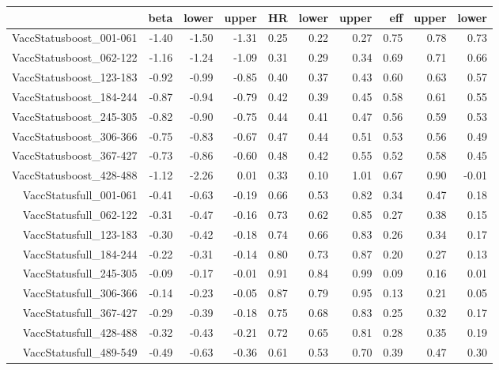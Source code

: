 \begin{table}[ht]
\centering
\begin{tabular}{rrrrrrrrrr}
  \hline
 & beta & lower & upper & HR & lower & upper & eff & upper & lower \\ 
  \hline
VaccStatusboost\_001-061 & -1.40 & -1.50 & -1.31 & 0.25 & 0.22 & 0.27 & 0.75 & 0.78 & 0.73 \\ 
  VaccStatusboost\_062-122 & -1.16 & -1.24 & -1.09 & 0.31 & 0.29 & 0.34 & 0.69 & 0.71 & 0.66 \\ 
  VaccStatusboost\_123-183 & -0.92 & -0.99 & -0.85 & 0.40 & 0.37 & 0.43 & 0.60 & 0.63 & 0.57 \\ 
  VaccStatusboost\_184-244 & -0.87 & -0.94 & -0.79 & 0.42 & 0.39 & 0.45 & 0.58 & 0.61 & 0.55 \\ 
  VaccStatusboost\_245-305 & -0.82 & -0.90 & -0.75 & 0.44 & 0.41 & 0.47 & 0.56 & 0.59 & 0.53 \\ 
  VaccStatusboost\_306-366 & -0.75 & -0.83 & -0.67 & 0.47 & 0.44 & 0.51 & 0.53 & 0.56 & 0.49 \\ 
  VaccStatusboost\_367-427 & -0.73 & -0.86 & -0.60 & 0.48 & 0.42 & 0.55 & 0.52 & 0.58 & 0.45 \\ 
  VaccStatusboost\_428-488 & -1.12 & -2.26 & 0.01 & 0.33 & 0.10 & 1.01 & 0.67 & 0.90 & -0.01 \\ 
  VaccStatusfull\_001-061 & -0.41 & -0.63 & -0.19 & 0.66 & 0.53 & 0.82 & 0.34 & 0.47 & 0.18 \\ 
  VaccStatusfull\_062-122 & -0.31 & -0.47 & -0.16 & 0.73 & 0.62 & 0.85 & 0.27 & 0.38 & 0.15 \\ 
  VaccStatusfull\_123-183 & -0.30 & -0.42 & -0.18 & 0.74 & 0.66 & 0.83 & 0.26 & 0.34 & 0.17 \\ 
  VaccStatusfull\_184-244 & -0.22 & -0.31 & -0.14 & 0.80 & 0.73 & 0.87 & 0.20 & 0.27 & 0.13 \\ 
  VaccStatusfull\_245-305 & -0.09 & -0.17 & -0.01 & 0.91 & 0.84 & 0.99 & 0.09 & 0.16 & 0.01 \\ 
  VaccStatusfull\_306-366 & -0.14 & -0.23 & -0.05 & 0.87 & 0.79 & 0.95 & 0.13 & 0.21 & 0.05 \\ 
  VaccStatusfull\_367-427 & -0.29 & -0.39 & -0.18 & 0.75 & 0.68 & 0.83 & 0.25 & 0.32 & 0.17 \\ 
  VaccStatusfull\_428-488 & -0.32 & -0.43 & -0.21 & 0.72 & 0.65 & 0.81 & 0.28 & 0.35 & 0.19 \\ 
  VaccStatusfull\_489-549 & -0.49 & -0.63 & -0.36 & 0.61 & 0.53 & 0.70 & 0.39 & 0.47 & 0.30 \\ 

\end{tabular}
\end{table}
